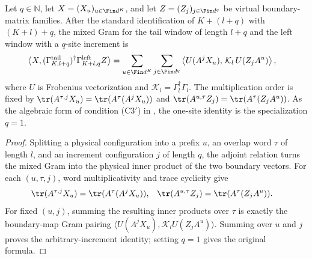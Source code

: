 \begin{lemma}%
    \label{thm:spectator_boundary_mixed_gram}
    \leanok
    Let $q\in\mathbb N$, let $X=(X_u)_{u\in\Fin d^K}$, and let
    $Z=(Z_j)_{j\in\Fin d^q}$ be virtual boundary-matrix families.  After the
    standard identification of $K+(l+q)$ with $(K+l)+q$, the mixed Gram for
    the tail window of length $l+q$ and the left window with a $q$-site
    increment is
    \begin{align}
        \left\langle X,
        (\Gamma^{\mathrm{tail}}_{K,l+q})^\dagger
        \Gamma^{\mathrm{left}}_{K+l,q}Z\right\rangle
         & =\sum_{u\in\Fin d^K}\sum_{j\in\Fin d^q}
        \left\langle
        U(A^jX_u),\,
        \mathcal K_l\,U(Z_jA^u)
        \right\rangle,
    \end{align}
    where $U$ is Frobenius vectorization and
    $\mathcal K_l=\Gamma_l^\dagger\Gamma_l$.  The multiplication order is
    fixed by
    $\tr(A^{\tau,j}X_u)=\tr(A^\tau(A^jX_u))$ and
    $\tr(A^{u,\tau}Z_j)=\tr(A^\tau(Z_jA^u))$.
    As the algebraic form of condition (C3$'$) in
    \cite[Equation~(2.5)]{Nachtergaele1996Spectral}, the one-site identity is
    the specialization $q=1$.
\end{lemma}
\begin{proof}
    \leanok
    Splitting a physical configuration into a prefix $u$, an overlap word $\tau$
    of length $l$, and an increment configuration $j$ of length $q$, the
    adjoint relation turns the mixed Gram into the physical inner product of
    the two boundary vectors.  For each $(u,\tau,j)$, word multiplicativity
    and trace cyclicity give
    \begin{align}
        \tr(A^{\tau,j}X_u) & =\tr(A^\tau(A^jX_u)), &
        \tr(A^{u,\tau}Z_j) & =\tr(A^\tau(Z_jA^u)).
    \end{align}
    For fixed $(u,j)$, summing the resulting inner products over $\tau$ is
    exactly the boundary-map Gram pairing
    $\langle U(A^jX_u),\mathcal K_l U(Z_jA^u)\rangle$.  Summing over $u$ and
    $j$ proves the arbitrary-increment identity; setting $q=1$ gives the
    original formula.
\end{proof}

